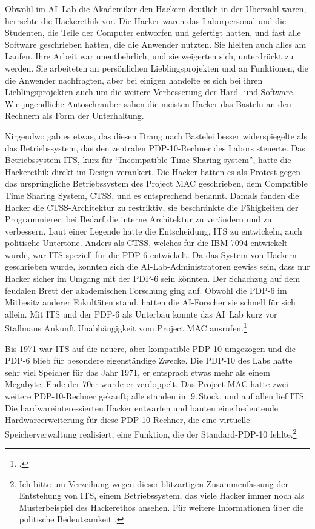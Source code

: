 Obwohl im AI~Lab die Akademiker den Hackern deutlich in der Überzahl waren, herrschte die Hackerethik vor. Die Hacker waren das Laborpersonal und die Studenten, die Teile der Computer entworfen und gefertigt hatten, und fast alle Software geschrieben hatten, die die Anwender nutzten. Sie hielten auch alles am Laufen. Ihre Arbeit war unentbehrlich, und sie weigerten sich, unterdrückt zu werden. Sie arbeiteten an persönlichen Lieblingsprojekten und an Funktionen, die die Anwender nachfragten, aber bei einigen handelte es sich bei ihren Lieblingsprojekten auch um die weitere Verbesserung der Hard- und Software. Wie jugendliche Autoschrauber sahen die meisten Hacker das Basteln an den Rechnern als Form der Unterhaltung.

Nirgendwo gab es etwas, das diesen Drang nach Bastelei besser widerspiegelte als das Betriebssystem, das den zentralen PDP-10-Rechner des Labors steuerte. Das Betriebssystem ITS, kurz für "`Incompatible Time Sharing system"', hatte die Hackerethik direkt im Design verankert. Die Hacker hatten es als Protest gegen das ursprüngliche Betriebssystem des Project MAC geschrieben, dem Compatible Time Sharing System, CTSS, und es entsprechend benannt. Damals fanden die Hacker die CTSS-Architektur zu restriktiv, sie beschränkte die Fähigkeiten der Programmierer, bei Bedarf die interne Architektur zu verändern und zu verbessern. Laut einer Legende hatte die Entscheidung, ITS zu entwickeln, auch politische Untertöne. Anders als CTSS, welches für die IBM 7094 entwickelt wurde, war ITS speziell für die PDP-6 entwickelt. Da das System von Hackern geschrieben wurde, konnten sich die AI-Lab-Administratoren gewiss sein, dass nur Hacker sicher im Umgang mit der PDP-6 sein könnten. Der Schachzug auf dem feudalen Brett der akademischen Forschung ging auf. Obwohl die PDP-6 im Mitbesitz anderer Fakultäten stand, hatten die AI-Forscher sie schnell für sich allein. Mit ITS und der PDP-6 als Unterbau konnte das AI~Lab kurz vor Stallmans Ankunft Unabhängigkeit vom Project MAC ausrufen.\footcite{hackers}

Bis 1971 war ITS auf die neuere, aber kompatible PDP-10 umgezogen und die PDP-6 blieb für besondere eigenständige Zwecke. Die PDP-10 des Labs hatte sehr viel Speicher für das Jahr 1971, er entsprach etwas mehr als einem Megabyte; Ende der 70er wurde er verdoppelt. Das Project MAC hatte zwei weitere PDP-10-Rechner gekauft; alle standen im 9.\,Stock, und auf allen lief ITS. Die hardwareinteressierten Hacker entwarfen und bauten eine bedeutende Hardwareerweiterung für diese PDP-10-Rechner, die eine virtuelle Speicherverwaltung realisiert, eine Funktion, die der Standard-PDP-10 fehlte.\footnote{Ich bitte um Verzeihung wegen dieser blitzartigen Zusammenfassung der Entstehung von ITS, einem Betriebssystem, das viele Hacker immer noch als Musterbeispiel des Hackerethos ansehen. Für weitere Informationen über die politische Bedeutsamkeit \cite[siehe][]{architects}.}

